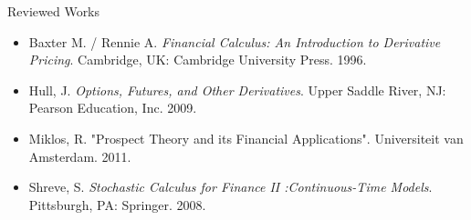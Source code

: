 \documentclass{beamer}
\begin{document}
\begin{frame}
\begin{center}
Reviewed Works
\end{center}
\begin{itemize}
\item
Baxter M. / Rennie A. \emph{Financial Calculus: An Introduction to Derivative Pricing}. Cambridge, UK: Cambridge University Press. 1996.
\item
Hull, J. \emph{Options, Futures, and Other Derivatives}. Upper Saddle River, NJ: Pearson Education, Inc. 2009.
\item
Miklos, R. "Prospect Theory and its Financial Applications". Universiteit van Amsterdam. 2011.
\item
Shreve, S. \emph{Stochastic Calculus for Finance II :Continuous-Time Models}. Pittsburgh, PA: Springer. 2008.
\end{itemize}
\end{frame}
\end{document}
